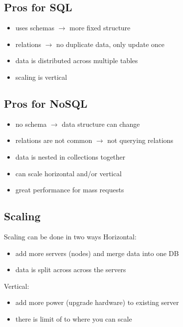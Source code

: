 \subsection{Pros for SQL}
\begin{itemize}
  \item uses schemas ${\xrightarrow{}}$ more fixed structure
  \item relations ${\xrightarrow{}}$ no duplicate data, only update once
  \item data is distributed across multiple tables
  \item scaling is vertical
\end{itemize}

\subsection{Pros for NoSQL}
\begin{itemize}
  \item no schema ${\xrightarrow{}}$ data structure can change
  \item relations are not common ${\xrightarrow{}}$ not querying relations 
  \item data is nested in collections together
  \item can scale horizontal and/or vertical
  \item great performance for mass requests
\end{itemize}

\subsection{Scaling}
Scaling can be done in two ways \parencite{cattell2011scalable}
\newline
Horizontal:
\begin{itemize}
    \item add more servers (nodes) and merge data into one DB
    \item data is split across across the servers
\end{itemize}
Vertical:
\begin{itemize}
    \item add more power (upgrade hardware) to existing server 
    \item there is limit of to where you can scale
\end{itemize}



